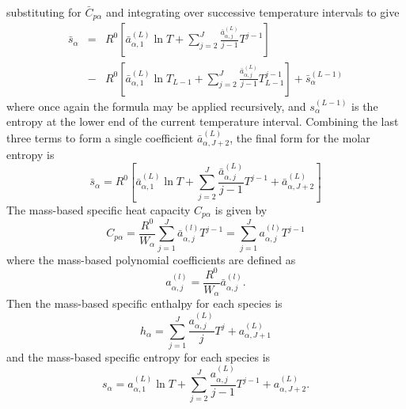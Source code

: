 \documentclass[dvips]{article}
\begin{document}
substituting for $\bar{C}_{p\alpha}$ and integrating over successive
temperature intervals to give
\begin{eqnarray}
\bar{s}_{\alpha}
& = & R^{0}\left[
\bar{a}_{\alpha,1}^{(L)}\ln{T}
+ \sum_{j=2}^{J} \frac{\bar{a}_{\alpha,j}^{(L)}}{j-1}T^{j-1}
\right]\nonumber\\
& - & R^{0}\left[
\bar{a}_{\alpha,1}^{(L)}\ln{T_{L-1}} +
\sum_{j=2}^{J} \frac{\bar{a}_{\alpha,j}^{(L)}}{j-1}T_{L-1}^{j-1}\right] +
\bar{s}_{\alpha}^{(L-1)}
\end{eqnarray}
where once again the formula may be applied recursively, and
$s_{\alpha}^{(L-1)}$ is the entropy at the lower end of the current
temperature interval.
Combining the last three terms to form a single coefficient
$\bar{a}_{\alpha,J+2}^{(L)}$, the final form for the molar entropy is
\begin{equation}
\bar{s}_{\alpha} = R^{0}\left[
\bar{a}_{\alpha,1}^{(L)}\ln{T} +
\sum_{j=2}^{J} \frac{\bar{a}_{\alpha,j}^{(L)}}{j-1}T^{j-1}
+ \bar{a}_{\alpha,J+2}^{(L)}
\right]
\label{ENTRMOL}
\end{equation}
The mass-based specific heat capacity $C_{p\alpha}$ is given by
\begin{equation}
C_{p\alpha}
= \frac{R^{0}}{W_{\alpha}}\sum_{j=1}^{J} \bar{a}_{\alpha,j}^{(l)}T^{j-1}
= \sum_{j=1}^{J} a_{\alpha,j}^{(l)}T^{j-1}
\end{equation}
where the mass-based polynomial coefficients are defined as
\begin{equation}
a_{\alpha,j}^{(l)} = \frac{R^{0}}{W_{\alpha}} \bar{a}_{\alpha,j}^{(l)}.
\end{equation}
Then the mass-based specific enthalpy for each species is
\begin{equation}
h_{\alpha} = 
\sum_{j=1}^{J} \frac{a_{\alpha,j}^{(L)}}{j}T^{j}
+ a_{\alpha,J+1}^{(L)}
\label{ENTHMAS}
\end{equation}
and the mass-based specific entropy for each species is
\begin{equation}
s_{\alpha} =
a_{\alpha,1}^{(L)}\ln{T} +
\sum_{j=2}^{J} \frac{a_{\alpha,j}^{(L)}}{j-1}T^{j-1}
+ a_{\alpha,J+2}^{(L)}.
\label{ENTRMAS}
\end{equation}
\end{document}
